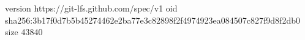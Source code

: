 version https://git-lfs.github.com/spec/v1
oid sha256:3b17f0d7b5b45274462e2ba77e3c82898f2f4974923ea084507c827f9d8f2db0
size 43840
